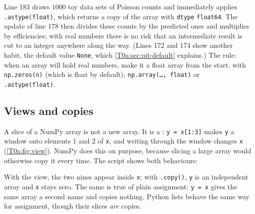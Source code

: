 Line 183 draws $1000$ toy data sets of Poisson counts and immediately applies \texttt{.astype(float)}, which returns a copy of the array with \texttt{dtype} \texttt{float64}. The update of line 178 then divides these counts by the predicted ones and multiplies by efficiencies; with real numbers there is no risk that an intermediate result is cut to an integer anywhere along the way. (Lines 172 and 174 show another habit, the default value \texttt{None}, which \cref{T0a:sec:pit-default} explains.) The rule: when an array will hold real numbers, make it a float array from the start, with \texttt{np.zeros(n)} (which is float by default), \texttt{np.array(\dots, float)} or \texttt{.astype(float)}.

\subsection{Views and copies}
\label{T0a:sec:pit-view}

A slice of a NumPy array is not a new array. It is a  : \texttt{y = x[1:3]} makes \texttt{y} a window onto elements $1$ and $2$ of \texttt{x}, and writing through the window changes \texttt{x} (\cref{T0a:fig:view}). NumPy does this on purpose, because slicing a large array would otherwise copy it every time. The script shows both behaviours:


With the view, the two nines appear inside \texttt{x}; with \texttt{.copy()}, \texttt{y} is an independent array and \texttt{x} stays zero. The same is true of plain assignment: \texttt{y = x} gives the same array a second name and copies nothing. Python lists behave the same way for assignment, though their slices \emph{are} copies.

